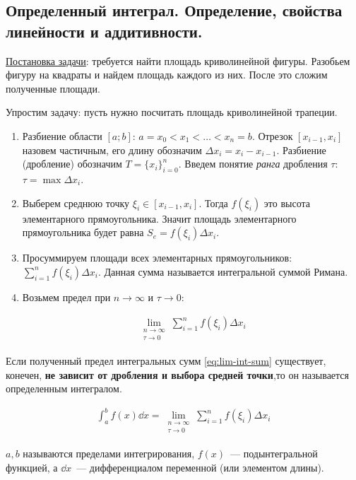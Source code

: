 \subsection{%
  Определенный интеграл. Определение, свойства линейности и аддитивности.%
}

\underline{Постановка задачи}: требуется найти площадь криволинейной фигуры.
Разобьем фигуру на квадраты и найдем площадь каждого из них. После это сложим
полученные площади.



Упростим задачу: пусть нужно посчитать площадь криволинейной трапеции.

\begin{twocolumns}
  
  \columnbreak

  \begin{enumerate}
    \item Разбиение области \([a;b]\):
    \(a = x_{0} < x_{1} < \dotsc < x_{n} = b\).
    Отрезок \([x_{i - 1}, x_{i}]\) назовем частичным, его длину обозначим 
    \(\Delta x_{i} = x_{i} - x_{i - 1}\).
    Разбиение (дробление) обозначим \(T = \{ x_{i} \}_{i = 0}^{n}\). Введем
    понятие \textit{ранга} дробления \(\tau\): \(\tau = \max \Delta x_{i}\).

    \item Выберем среднюю точку \(\xi_{i} \in [x_{i - 1}, x_{i}]\). Тогда
    \(f(\xi_{i})\) это высота элементарного прямоугольника. Значит площадь
    элементарного прямоугольника будет равна
    \(S_{e} = f(\xi_{i}) \Delta x_{i}\).

    \item Просуммируем площади всех элементарных прямоугольников:
    \(\sum_{i = 1}^{n} f(\xi_{i}) \Delta x_{i}\). Данная сумма называется
    интегральной суммой Римана.

    \item Возьмем предел при \(n \to \infty\) и \(\tau \to 0\):
    
    \begin{align*}\label{eq:lim-int-sum}\tag{1}
      \lim_{\substack{n \to \infty \\ \tau \to 0}}
        \sum_{i = 1}^{n} f(\xi_{i}) \Delta x_{i}
    \end{align*}
  \end{enumerate}
\end{twocolumns}

\begin{definition}
  Если полученный предел интегральных сумм \eqref{eq:lim-int-sum} существует,
  конечен, \textbf{не зависит от дробления и выбора средней точки},то он
  называется определенным интегралом.

  \begin{align*}
    \int_{a}^{b} f(x) \dd x = \lim_{\substack{n \to \infty \\ \tau \to 0}}
      \sum_{i = 1}^{n} f(\xi_{i}) \Delta x_{i}
  \end{align*}

  \(a, b\) называются пределами интегрирования, \(f(x)\)~--- подынтегральной
  функцией, а \(\dd x\)~--- дифференциалом переменной (или элементом длины).
\end{definition}

